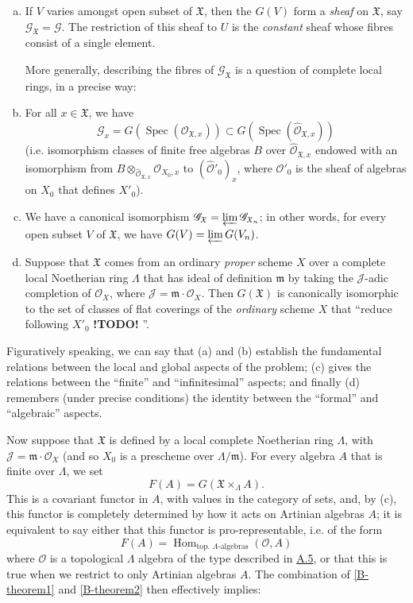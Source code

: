 \documentclass{article}
\theoremstyle{plain}
\theoremstyle{definition}
\newcommand{\sh}[1]{{\mathscr{#1}}}
\newcommand{\fk}[1]{{\mathfrak{#1}}}
\DeclareMathOperator{\Hom}{Hom}
\DeclareMathOperator{\Spec}{Spec}
\newcommand{\todo}{\textbf{ !TODO! }}
\newcommand{\oldpage}[1]{\marginpar{\footnotesize$\Big\vert$ \textit{p.~#1}}}
\begin{document}
\begin{enumerate}[(a)]
  \item If $V$ varies amongst open subset of $\fk{X}$, then the $G(V)$ form a \emph{sheaf} on $\fk{X}$, say $\sh{G}_\fk{X}=\sh{G}$.
    The restriction of this sheaf to $U$ is the \emph{constant} sheaf whose fibres consist of a single element.

    More generally, describing the fibres of $\sh{G}_\fk{X}$ is a question of complete local rings, in a precise way:
  \item For all $x\in\fk{X}$, we have
    \[
      \sh{G}_x = G(\Spec(\sh{O}_{\fk{X},x})) \subset G(\Spec(\widehat{\sh{O}}_{\fk{X},x}))
    \]
    (i.e. isomorphism classes of finite free algebras $B$ over $\widehat{\sh{O}}_{\fk{X},x}$ endowed with an isomorphism from $B\otimes_{\widehat{\sh{O}}_{\fk{X},x}}\sh{O}_{X_0,x}$ to $(\widehat{\sh{O}}'_0)_x$, where $\sh{O}'_0$ is the sheaf of algebras on $X_0$ that defines $X'_0$).
  \item We have a canonical isomorphism $\sh{G}_\fk{X}=\varprojlim\sh{G}_{\fk{X}_n}$; in other words, for every open subset $V$ of $\fk{X}$, we have $G(V)=\varprojlim G(V_n)$.
  \item Suppose that $\fk{X}$ comes from an ordinary \emph{proper} scheme $X$ over a complete local Noetherian ring $\Lambda$ that has ideal of definition $\fk{m}$ by taking the $\sh{J}$-adic completion of $\sh{O}_X$, where $\sh{J}=\fk{m}\cdot\sh{O}_X$.
    Then $G(\fk{X})$ is canonically isomorphic to the set of classes of flat coverings of the \emph{ordinary} scheme $X$ that ``reduce following $X'_0$\todo''.
\end{enumerate}

Figuratively speaking, we can say that (a) and (b) establish the fundamental relations between the local and global aspects of the problem; (c) gives the relations between the ``finite'' and ``infinitesimal'' aspects; and finally (d) remembers (under precise conditions) the identity between the ``formal'' and ``algebraic'' aspects.

Now suppose that $\fk{X}$ is defined by a local complete Noetherian ring $\Lambda$, with $\sh{J}=\fk{m}\cdot\sh{O}_X$ (and so $X_0$ is a prescheme over $\Lambda/\fk{m}$).
For every algebra $A$ that is finite over $\Lambda$, we set
\[
  F(A) = G(\fk{X}\times_\Lambda A).
\]
This is a covariant functor in $A$, with values in the category of sets, and, by (c), this functor is completely determined by how it acts on Artinian algebras $A$;
it is equivalent to say either that this functor is pro-representable, i.e. of the form
\[
  F(A) = \Hom_{\mbox{top. $\Lambda$-algebras}}(\sh{O},A)
\]
\oldpage{195-21}
where $\sh{O}$ is a topological $\Lambda$ algebra of the type described in \hyperref[A.5]{A.5}, or that this is true when we restrict to only Artinian algebras $A$.
The combination of \cref{B-theorem1} and \cref{B-theorem2} then effectively implies:
\end{document}
